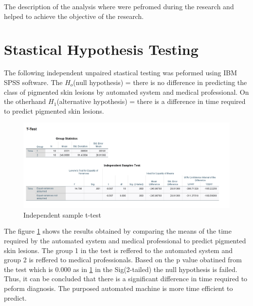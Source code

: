 The description of the analysis where were pefromed during the
research and helped to achieve the objective of the research.

\section{Stastical Hypothesis Testing}
The following independent unpaired stastical testing was peformed using 
IBM SPSS software. The ${H_o}$(null hypothesis) = there is no difference in 
predicting the class of pigmented skin lesions by automated system and 
medical professional. On the otherhand ${H_1}$(alternative hypothesis) = there is 
a difference in time required to predict pigmented skin lesions.
\begin{figure}[!htp]
    \includegraphics[width=15cm]{Images/ttest.png}
    \caption{Independent sample t-test}
    \label{fig:istt}
\end{figure}

The figure \ref{fig:istt} shows the results obtained by comparing the 
means of the time required by the automated system and medical professional to predict pigmented skin 
lesions. The group 1 in the test is reffered to the automated system and 
group 2 is reffered to medical professionals. Based on the p value obatined from the 
test which is 0.000 as in \ref{fig:istt} in the Sig(2-tailed) the null 
hypothesis is failed. Thus, it can be concluded that there is a significant 
difference in time required to peform diagnosis. The purposed automated machine 
is more time efficient to predict.

